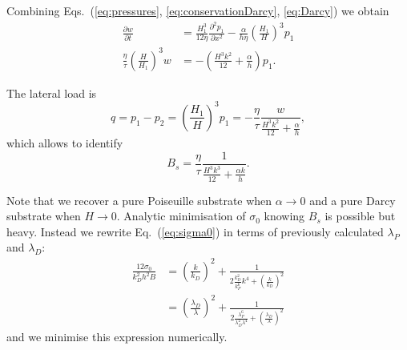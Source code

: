 \documentclass[12pt,a4paper]{revtex4}
\begin{document}
Combining Eqs.~(\ref{eq:pressures}, \ref{eq:conservationDarcy}, \ref{eq:Darcy}) we obtain
\begin{align}
\frac{\partial w}{\partial t} &= \frac{H_1^3}{12\eta} \frac{\partial^2 p_1}{\partial x^2} - \frac{\alpha}{h\eta} \left(\frac{H_1}{H}\right)^3 p_1\\
\frac{\eta}{\tau}\left(\frac{H}{H_1}\right)^3 w &= -\left(\frac{H^3 k^2}{12} + \frac{\alpha}{h}\right)p_1.
\end{align}

The lateral load is
\begin{equation}
q = p_1-p_2 = \left(\frac{H_1}{H}\right)^3 p_1 = - \frac{\eta}{\tau} \frac{w}{\frac{H^3 k^2}{12} + \frac{\alpha}{h}},
\end{equation}
which allows to identify 
\begin{equation}
B_s = \frac{\eta}{\tau}\frac{1}{\frac{H^3 k^3}{12} + \frac{\alpha k}{h}}.
\end{equation}

Note that we recover a pure Poiseuille substrate when $\alpha \rightarrow 0$ and a pure Darcy substrate when $H \rightarrow 0$. Analytic minimisation of $\sigma_0$ knowing $B_s$ is possible but heavy. Instead we rewrite Eq.~(\ref{eq:sigma0}) in terms of previously calculated $\lambda_P$ and $\lambda_D$:
\begin{align}
\frac{12\sigma_0}{k_D^2 h^2 B} &= \left(\frac{k}{k_D}\right)^2 + \frac{1}{2\frac{k_D^2}{k_P^6}k^4  + \left(\frac{k}{k_D}\right)^2}\\
&= \left(\frac{\lambda_D}{\lambda}\right)^2 + \frac{1}{2\frac{\lambda_P^6}{\lambda_D^2\lambda^4}  + \left(\frac{\lambda_D}{\lambda}\right)^2}
\end{align}
and we minimise this expression numerically.




\end{document}
